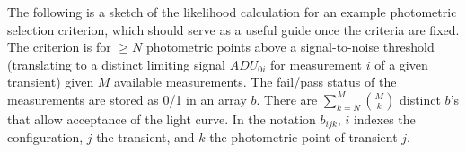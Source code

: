 \documentclass[preprint,3p]{elsarticle}
\begin{document}



The following is a sketch of the likelihood calculation for an example 
photometric selection criterion, which should serve as a useful guide once the criteria are fixed.
The criterion is for $\ge N$ photometric points
above a signal-to-noise threshold (translating to a distinct limiting signal $ADU_{0i}$
for measurement $i$ of a given transient) given $M$ available measurements. 
The fail/pass status of the measurements are stored as 0/1 in an array $b$.
There are $\sum_{k=N}^M \binom{M}{k}$ 
distinct $b$'s that allow acceptance of the light curve.  In the notation $b_{ijk}$, $i$ indexes
the configuration, $j$ the transient, and $k$ the photometric point of transient $j$.
\end{document}
